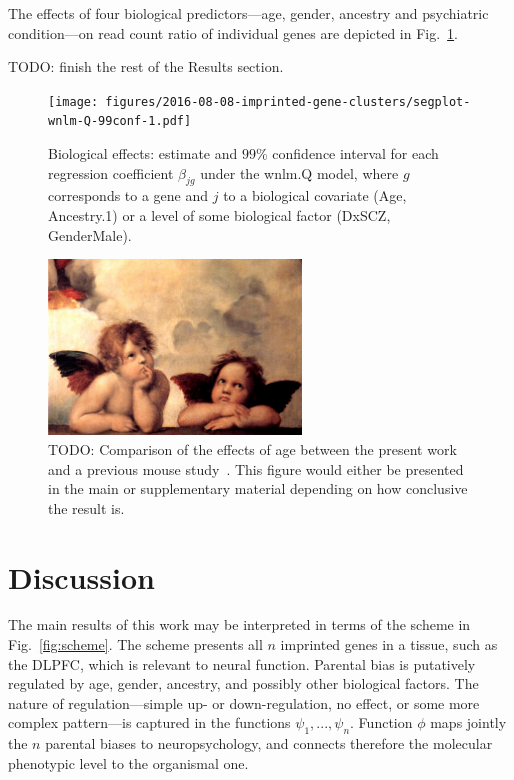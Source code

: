 \documentclass[letterpaper]{article}
\begin{document}
The effects of four biological predictors---age, gender, ancestry and
psychiatric condition---on read count ratio of individual genes are depicted
in Fig.~\ref{fig:biol-effects}.

TODO: finish the rest of the Results section.

\begin{figure}
\begin{center}
\texttt{[image: figures/2016-08-08-imprinted-gene-clusters/segplot-wnlm-Q-99conf-1.pdf]}
\end{center}
\caption{Biological effects: estimate and $99\%$ confidence interval for each
regression coefficient \(\beta_{jg}\) under the wnlm.Q model, where \(g\)
corresponds to a gene and \(j\) to a biological covariate (Age, Ancestry.1) or
a level of some biological factor (DxSCZ, GenderMale).}
\label{fig:biol-effects}
\end{figure}

\begin{figure}
\begin{center}
\includegraphics[width=0.6\textwidth]{figures/raffaello-putti.jpg}
\end{center}
\caption{TODO: Comparison of the effects of age between the present work and a
previous mouse study~\cite{Perez2015}.  This figure would either be presented
in the main or supplementary material depending on how conclusive the result
is.}
\label{fig:mouse-comparison}
\end{figure}


\section{Discussion}

The main results of this work may be interpreted in terms of the scheme in
Fig.~\ref{fig:scheme}.  The scheme presents all \(n\) imprinted genes in a
tissue, such as the DLPFC, which is relevant to neural function.  Parental
bias is putatively regulated by age, gender, ancestry, and possibly other
biological factors.  The nature of regulation---simple up- or down-regulation,
no effect, or some more complex pattern---is captured in the functions
\(\psi_1,...,\psi_n\).  Function \(\phi\) maps jointly the \(n\) parental
biases to neuropsychology, and connects therefore the molecular phenotypic
level to the organismal one.
\end{document}
